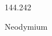 \documentclass[12pt]{article}
\begin{document}
\hfill{}
\vfill
\begin{center}
  {\fontsize{50}{60}
  }

  144.242

Neodymium
\end{center}
\vfill
\end{document}
